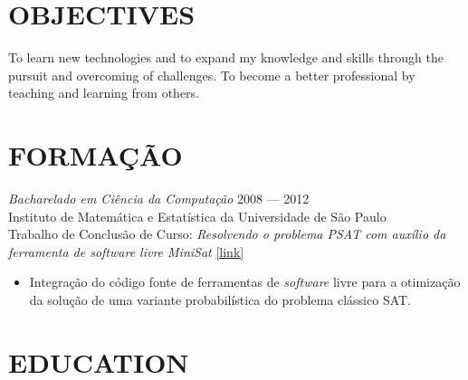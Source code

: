 \documentclass[]{res} %
\newcommand{\sbt}{\,\begin{picture}(-1,1)(-2,-3)\circle*{2}\end{picture}\ }
\def \divspace{6pt}
\def \myitemback{0.55cm}
\def \myitemsep{0pt}
\def \myprojectface{\it}
\def \myorgface{\sc}
\newif\ifport
\begin{document}
\begin{resume}

\ifport
    \section{OBJETIVOS \hspace{\divspace} }

    Aprender novas tecnologias e expandir conhecimentos e habilidades, através da busca e superação de desafios. Tornar-me um melhor profissional ensinando e aprendendo com os outros.
\else
    \section{OBJECTIVES \hspace{\divspace} }

    To learn new technologies and to expand my knowledge and skills through the pursuit and overcoming of challenges. To become a better professional by teaching and learning from others.
\fi

\ifport
    \section{FORMAÇÃO \hspace{\divspace} }

    {\myprojectface Bacharelado em Ciência da Computação} \hfill 2008 — 2012 \\
    {\myorgface Instituto de Matemática e Estatística} da {\myorgface Universidade de São Paulo} \\
    Trabalho de Conclusão de Curso: {\sl Resolvendo o problema PSAT com auxílio da ferramenta de software livre MiniSat} \href{http://www.ime.usp.br/~cef/mac499-12/monografias/rec/mikail/index.html}{[link]}
    \begin{itemize}[itemsep=\myitemsep,leftmargin=\myitemback]
    \item[\sbt] Integração do código fonte de ferramentas de {\it software} livre para a otimização da solução de uma variante probabilística do problema clássico SAT.
    \end{itemize}

\else
    \section{EDUCATION \hspace{\divspace} }


\end{resume}
\end{document}
